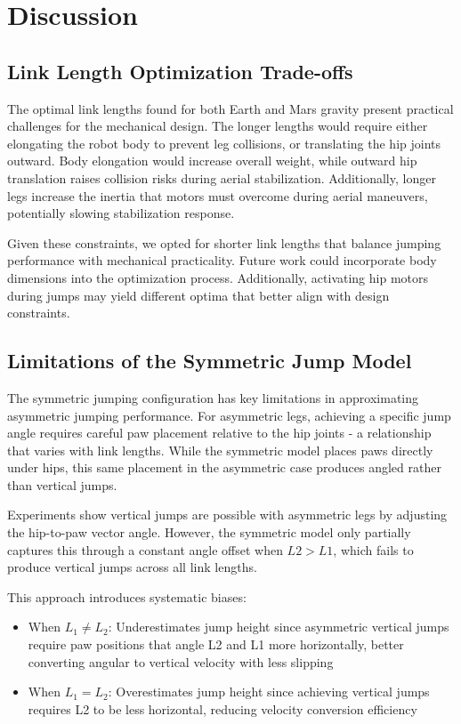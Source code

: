 \section{Discussion}

\subsection{Link Length Optimization Trade-offs}
The optimal link lengths found for both Earth and Mars gravity present practical challenges for the mechanical design. The longer lengths would require either elongating the robot body to prevent leg collisions, or translating the hip joints outward. Body elongation would increase overall weight, while outward hip translation raises collision risks during aerial stabilization. Additionally, longer legs increase the inertia that motors must overcome during aerial maneuvers, potentially slowing stabilization response.

Given these constraints, we opted for shorter link lengths that balance jumping performance with mechanical practicality. Future work could incorporate body dimensions into the optimization process. Additionally, activating hip motors during jumps may yield different optima that better align with design constraints.

\subsection{Limitations of the Symmetric Jump Model}
The symmetric jumping configuration has key limitations in approximating asymmetric jumping performance. For asymmetric legs, achieving a specific jump angle requires careful paw placement relative to the hip joints - a relationship that varies with link lengths. While the symmetric model places paws directly under hips, this same placement in the asymmetric case produces angled rather than vertical jumps.

Experiments show vertical jumps are possible with asymmetric legs by adjusting the hip-to-paw vector angle. However, the symmetric model only partially captures this through a constant angle offset when $L2 > L1$, which fails to produce vertical jumps across all link lengths.

This approach introduces systematic biases:
\begin{itemize}
    \item When \(L_1 \neq L_2\): Underestimates jump height since asymmetric vertical jumps require paw positions that angle L2 and L1 more horizontally, better converting angular to vertical velocity with less slipping
    \item When \(L_1 = L_2\): Overestimates jump height since achieving vertical jumps requires L2 to be less horizontal, reducing velocity conversion efficiency
\end{itemize}

